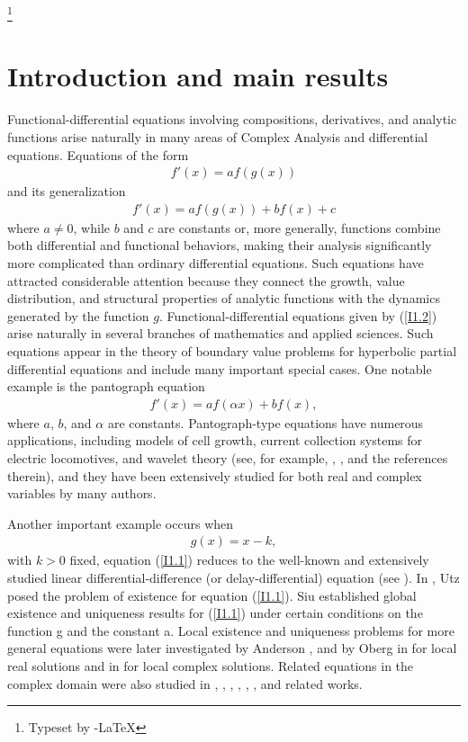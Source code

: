\documentclass[11pt,reqno]{amsart}
\numberwithin{equation}{section}
\begin{document}
\thanks{Typeset by \AmS -\LaTeX}
\maketitle


\section{{\bf Introduction and main results}}

Functional-differential equations involving compositions, derivatives, and analytic functions arise naturally in many areas of Complex Analysis and differential equations. Equations of the form
\begin{align}\label{I1.1}
f'(x)=af(g(x))
\end{align}
and its generalization
\begin{align}\label{I1.2}
f'(x)=af(g(x))+bf(x)+c
\end{align}
where $a\neq 0$, while $b$ and $c$ are constants or, more generally, functions combine both differential and functional behaviors, making their analysis significantly more complicated than ordinary differential equations. Such equations have attracted considerable attention because they connect the growth, value distribution, and structural properties of analytic functions with the dynamics generated by the function $g$. Functional-differential equations given by (\ref{I1.2}) arise naturally in several branches of mathematics and applied sciences. Such equations appear in the theory of boundary value problems for hyperbolic partial differential equations and include many important special cases. One notable example is the pantograph equation
\begin{align*}
f'(x)=af(\alpha x)+bf(x),
\end{align*}
where $a$, $b$, and $\alpha$ are constants. Pantograph-type equations have numerous applications, including models of cell growth, current collection systems for electric locomotives, and wavelet theory (see, for example, \cite{O-T-1971}, \cite{W-C-K-B-2000}, and the references therein), and they have been extensively studied for both real and complex variables by many authors.

Another important example occurs when
\begin{align*}
g(x)=x-k,
\end{align*}
with $k>0$ fixed, equation (\ref{I1.1}) reduces to the well-known and extensively studied linear differential-difference (or delay-differential) equation (see \cite{B-C-1963}). In \cite{U-1965}, Utz posed the problem of existence for equation (\ref{I1.1}). Siu \cite{S-1965} established global existence and uniqueness results for (\ref{I1.1}) under certain conditions on the function g and the constant a. Local existence and uniqueness problems for more general equations were later investigated by Anderson \cite{A-1966}, and by Oberg in \cite{O-1969} for local real solutions and in \cite{O-1971} for local complex solutions. Related equations in the complex domain were also studied in \cite{B-1997}, \cite{BMW-2004}, \cite{D-1995}, \cite{D-I-1997}, \cite{G-1967}, \cite{G-Y-1973}, and related works.
\end{document}

